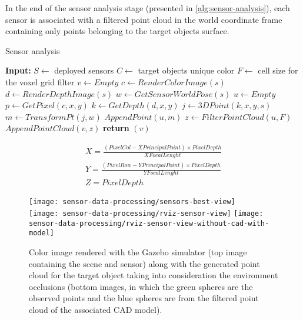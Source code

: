In the end of the sensor analysis stage (presented in \cref{alg:sensor-analysis}), each sensor is associated with a filtered point cloud in the world coordinate frame containing only points belonging to the target objects surface.

\begin{algorithm}
	\caption{Sensor analysis}
	\label{alg:sensor-analysis}
	\begin{algorithmic}[1]
		\State \textbf{Input:}
		\State $S \gets$ deployed sensors
		\State $C \gets$ target objects unique color
		\State $F \gets$ cell size for the voxel grid filter
			\State $v \gets Empty$
				\State $c \gets RenderColorImage(s)$
				\State $d \gets RenderDepthImage(s)$
				\State $w \gets GetSensorWorldPose(s)$
				\State $u \gets Empty$
						\State $p \gets GetPixel(c,x,y)$
							\State $k \gets GetDepth(d,x,y)$
								\State $j \gets 3DPoint(k,x,y,s)$
								\State $m \gets TransformPt(j,w)$
								\State $AppendPoint(u,m)$
							\EndIf
						\EndIf
					\EndFor
				\EndFor
				\State $z \gets FilterPointCloud(u,F)$
				\State $AppendPointCloud(v,z)$
			\EndFor
			\State \textbf{return} $(v)$
		\EndProcedure
	\end{algorithmic}
\end{algorithm}

\footnotesize
\begin{equation}\label{eq:pointcloud}
	\begin{split}
		X = \frac{(PixelCol - XPrincipalPoint) \times PixelDepth}{XFocalLenght}\\
		Y = \frac{(PixelRow - YPrincipalPoint) \times PixelDepth}{YFocalLenght}\\
		Z = PixelDepth
	\end{split}
\end{equation}
\normalsize

\begin{figure}
	\centering
	\texttt{[image: sensor-data-processing/sensors-best-view]}\\
	\vspace{0.5em}
	\texttt{[image: sensor-data-processing/rviz-sensor-view]}\hspace{2em}
	\texttt{[image: sensor-data-processing/rviz-sensor-view-without-cad-with-model]}
	\caption{Color image rendered with the Gazebo simulator (top image containing the scene and sensor) along with the generated point cloud for the target object taking into consideration the environment occlusions (bottom images, in which the green spheres are the observed points and the blue spheres are from the filtered point cloud of the associated CAD model).}
	\label{fig:sensor-data-processing}
\end{figure}


